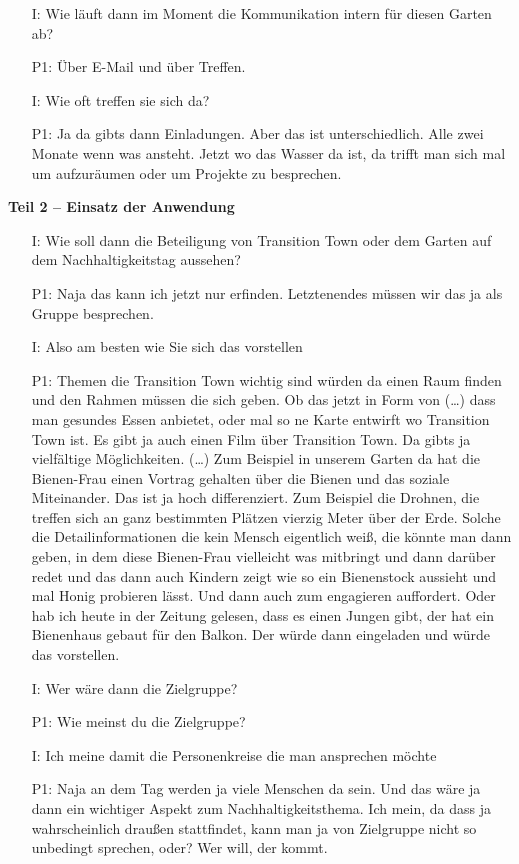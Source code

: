 \documentclass{sigchi}
\begin{document}
\begin{itemize}
	\item[I:] Wie l{\"a}uft dann im Moment die Kommunikation intern f{\"u}r diesen Garten ab?
	\item[P1:] Über E-Mail und {\"u}ber Treffen.
	\item[I:] Wie oft treffen sie sich da?
	\item[P1:] Ja da gibts dann Einladungen. Aber das ist unterschiedlich. Alle zwei Monate wenn was ansteht. Jetzt wo das Wasser da ist, da trifft man sich mal um aufzur{\"a}umen oder um Projekte zu besprechen.	
\end{itemize}

\textbf{Teil 2 -- Einsatz der Anwendung}
\begin{itemize}
	\item[I:] Wie soll dann die Beteiligung von Transition Town oder dem Garten auf dem Nachhaltigkeitstag aussehen?
	\item[P1:] Naja das kann ich jetzt nur erfinden. Letztenendes m{\"u}ssen wir das ja als Gruppe besprechen.
	\item[I:] Also am besten wie Sie sich das vorstellen
	\item[P1:] Themen die Transition Town wichtig sind w{\"u}rden da einen Raum finden und den Rahmen m{\"u}ssen die sich geben. Ob das jetzt in Form von (\dots) dass man gesundes Essen anbietet, oder mal so ne Karte entwirft wo Transition Town ist. Es gibt ja auch einen Film {\"u}ber Transition Town. Da gibts ja vielf{\"a}ltige M{\"o}glichkeiten. (\dots) Zum Beispiel in unserem Garten da hat die Bienen-Frau einen Vortrag gehalten {\"u}ber die Bienen und das soziale Miteinander. Das ist ja hoch differenziert. Zum Beispiel die Drohnen, die treffen sich an ganz bestimmten Pl{\"a}tzen vierzig Meter {\"u}ber der Erde. Solche die Detailinformationen die kein Mensch eigentlich wei{\ss}, die k{\"o}nnte man dann geben, in dem diese Bienen-Frau vielleicht was mitbringt und dann dar{\"u}ber redet und das dann auch Kindern zeigt wie so ein Bienenstock aussieht und mal Honig probieren l{\"a}sst. Und dann auch zum engagieren auffordert. Oder hab ich heute in der Zeitung gelesen, dass es einen Jungen gibt, der hat ein Bienenhaus gebaut f{\"u}r den Balkon. Der w{\"u}rde dann eingeladen und w{\"u}rde das vorstellen.
	\item[I:] Wer w{\"a}re dann die Zielgruppe? 
	\item[P1:] Wie meinst du die Zielgruppe?
	\item[I:] Ich meine damit die Personenkreise die man ansprechen m{\"o}chte
	\item[P1:] Naja an dem Tag werden ja viele Menschen da sein. Und das w{\"a}re ja dann ein wichtiger Aspekt zum Nachhaltigkeitsthema. Ich mein, da dass ja wahrscheinlich drau{\ss}en stattfindet, kann man ja von Zielgruppe nicht so unbedingt sprechen, oder? Wer will, der kommt.

\end{itemize}
\end{document}
